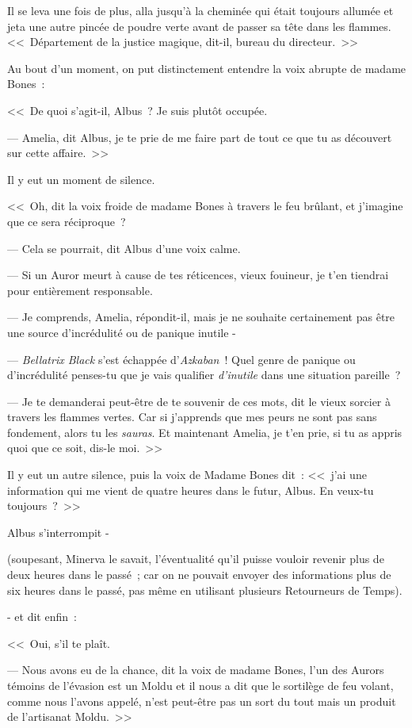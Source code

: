 Il se leva une fois de plus, alla jusqu'à la cheminée qui était toujours allumée et jeta une autre pincée de poudre verte avant de passer sa tête dans les flammes. <<~Département de la justice magique, dit-il, bureau du directeur.~>>

Au bout d'un moment, on put distinctement entendre la voix abrupte de madame Bones~:

<<~De quoi s'agit-il, Albus~? Je suis plutôt occupée.

--- Amelia, dit Albus, je te prie de me faire part de tout ce que tu as découvert sur cette affaire.~>>

Il y eut un moment de silence.

<<~Oh, dit la voix froide de madame Bones à travers le feu brûlant, et j'imagine que ce sera réciproque~?

--- Cela se pourrait, dit Albus d'une voix calme.

--- Si un Auror meurt à cause de tes réticences, vieux fouineur, je t'en tiendrai pour entièrement responsable.

--- Je comprends, Amelia, répondit-il, mais je ne souhaite certainement pas être une source d'incrédulité ou de panique inutile -

--- \emph{Bellatrix Black} s'est échappée d'\emph{Azkaban}~! Quel genre de panique ou d'incrédulité penses-tu que je vais qualifier \emph{d'inutile} dans une situation pareille~?

--- Je te demanderai peut-être de te souvenir de ces mots, dit le vieux sorcier à travers les flammes vertes. Car si j'apprends que mes peurs ne sont pas sans fondement, alors tu les \emph{sauras}. Et maintenant Amelia, je t'en prie, si tu as appris quoi que ce soit, dis-le moi.~>>

Il y eut un autre silence, puis la voix de Madame Bones dit~: <<~j'ai une information qui me vient de quatre heures dans le futur, Albus. En veux-tu toujours~?~>>

Albus s'interrompit -

(soupesant, Minerva le savait, l'éventualité qu'il puisse vouloir revenir plus de deux heures dans le passé~; car on ne pouvait envoyer des informations plus de six heures dans le passé, pas même en utilisant plusieurs Retourneurs de Temps).

- et dit enfin~:

<<~Oui, s'il te plaît.

--- Nous avons eu de la chance, dit la voix de madame Bones, l'un des Aurors témoins de l'évasion est un Moldu et il nous a dit que le sortilège de feu volant, comme nous l'avons appelé, n'est peut-être pas un sort du tout mais un produit de l'artisanat Moldu.~>>

